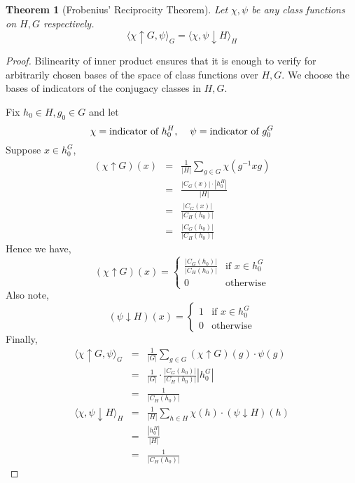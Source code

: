 \documentclass{sig-alternate}
\newtheorem{theorem}{Theorem}[section]
\begin{document}
\begin{theorem}[Frobenius' Reciprocity Theorem]
Let $\chi, \psi$ be any class functions on $H, G$ respectively.
\[ \langle\chi\uparrow G, \psi\rangle_G = \langle\chi, \psi\downarrow H\rangle_H \] 
\end{theorem}

\begin{proof}
Bilinearity of inner product ensures that it is enough to verify for arbitrarily chosen bases of the space of class functions over $H, G$. We choose the bases of indicators of the conjugacy classes in $H, G$.

Fix $h_0\in H, g_0\in G$ and let
\[\chi = \mbox{indicator of } h_0^H,\hspace*{0.4cm}  \psi = \mbox{indicator of } g_0^G \]
Suppose $x\in h_0^G$,
\begin{eqnarray*}
(\chi\uparrow G)(x) & = & \frac{1}{|H|}\sum_{g\in G}\chi(g^{-1}xg) \\
& = & \frac{|C_G(x)|\cdot |h_0^H|}{|H|} \\
& = & \frac{|C_G(x)|}{|C_H(h_0)|} \\
& = & \frac{|C_G(h_0)|}{|C_H(h_0)|}
\end{eqnarray*}
Hence we have,
\[ (\chi\uparrow G)(x) = \begin{cases} \frac{|C_G(h_0)|}{|C_H(h_0)|} & \text{if } x\in h_0^G \\ 0 & \text{otherwise}\end{cases} \]
Also note,
\[ (\psi\downarrow H)(x) = \begin{cases} 1 & \text{if } x\in h_0^G \\ 0 & \text{otherwise}\end{cases} \]
Finally,
\begin{eqnarray*}
\langle\chi\uparrow G, \psi\rangle_G & = & \frac{1}{|G|}\sum_{g\in G}(\chi\uparrow G)(g)\cdot \psi(g) \\
& = & \frac{1}{|G|}\cdot  \frac{|C_G(h_0)|}{|C_H(h_0)|} |h_0^G| \\
& = & \frac{1}{|C_H(h_0)|} \\
\langle\chi, \psi\downarrow H\rangle_H & = &  \frac{1}{|H|}\sum_{h\in H}\chi(h)\cdot (\psi\downarrow H)(h) \\
& = & \frac{|h_0^H|}{|H|} \\& = &  \frac{1}{|C_H(h_0)|}
\end{eqnarray*}
\end{proof}
\end{document}
